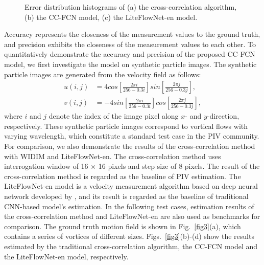 \documentclass[%
 aip,
 amsmath,amssymb,
 reprint,%
]{revtex4-1}
\begin{document}
\begin{figure*}
	\begin{center}
		\caption{Error distribution histograms of (a) the cross-correlation algorithm, (b) the CC-FCN model, (c) the LiteFlowNet-en model.}
		\label{fig5}
	\end{center}
\end{figure*}

Accuracy represents the closeness of the measurement values to the ground truth, and precision exhibits the closeness of the measurement values to each other.
To quantitatively demonstrate the accuracy and precision of the proposed CC-FCN model, we first investigate the model on synthetic particle images. The synthetic particle images are generated from the velocity field as follows:
\begin{equation}
\begin{split}
u(i,j)&=4cos\left[\frac{2\pi i}{256-0.3i}\right]sin\left[\frac{2\pi j}{256-0.3j}\right],\\
v(i,j)&=-4sin\left[\frac{2\pi i}{256-0.3i}\right]cos\left[\frac{2\pi j}{256-0.3j}\right],
\label{eqn8}
\end{split}
\end{equation}
where $i$ and $j$ denote the index of the image pixel along $x$- and $y$-direction, respectively.
These synthetic particle images correspond to vortical flows with varying wavelength, which constitute a standard test case in the PIV community.
For comparison, we also demonstrate the results of the cross-correlation method with WIDIM and LiteFlowNet-en. 
The cross-correlation method uses interrogation window of 16 $\times$ 16 pixels and step size of 8 pixels.
The result of the cross-correlation method is regarded as the baseline of PIV estimation.
The LiteFlowNet-en model is a velocity measurement algorithm based on deep neural network developed by \citet{cai2019particle}, and its result is regarded as the baseline of traditional CNN-based model's estimation.
In the following test cases, estimation results of the cross-correlation method and LiteFlowNet-en are also used as benchmarks for comparison.
The ground truth motion field is shown in Fig.~\ref{fig3}(a), which contains a series of vortices of different sizes. 
Figs.~\ref{fig3}(b)-(d) show the results estimated by the traditional cross-correlation algorithm, the CC-FCN model and the LiteFlowNet-en model, respectively.
\end{document}
